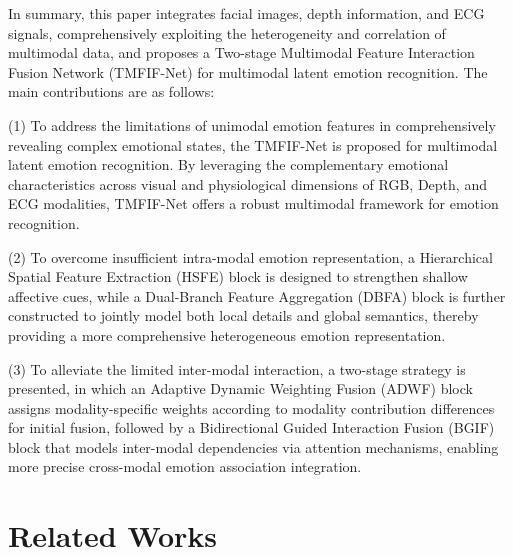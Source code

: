 \documentclass[lettersize,journal]{IEEEtran}
\begin{document}
In summary, this paper integrates facial images, depth information, and ECG signals, comprehensively exploiting the heterogeneity and correlation of multimodal data, and proposes a Two-stage Multimodal Feature Interaction Fusion Network (TMFIF-Net) for multimodal latent emotion recognition. The main contributions are as follows: 

(1) To address the limitations of unimodal emotion features in comprehensively revealing complex emotional states, the TMFIF-Net is proposed for multimodal latent emotion recognition. By leveraging the complementary emotional characteristics across visual and physiological dimensions of RGB, Depth, and ECG modalities, TMFIF-Net offers a robust multimodal framework for emotion recognition.

(2) To overcome insufficient intra-modal emotion representation, a Hierarchical Spatial Feature Extraction (HSFE) block is designed to strengthen shallow affective cues, while a Dual-Branch Feature Aggregation (DBFA) block is further constructed to jointly model both local details and global semantics, thereby providing a more comprehensive heterogeneous emotion representation.

(3) To alleviate the limited inter-modal interaction, a two-stage strategy is presented, in which an Adaptive Dynamic Weighting Fusion (ADWF) block assigns modality-specific weights according to modality contribution differences for initial fusion, followed by a Bidirectional Guided Interaction Fusion (BGIF) block that models inter-modal dependencies via attention mechanisms, enabling more precise cross-modal emotion association integration.

\section{Related Works}
\end{document}
